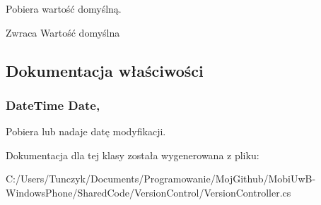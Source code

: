Pobiera wartość domyślną. 

\begin{DoxyReturn}{Zwraca}
Wartość domyślna
\end{DoxyReturn}


\subsection{Dokumentacja właściwości}
\hypertarget{a00021_a9f6dd5f0a254ed27ca791fe4aa2c35cf}{}
\subsubsection[{Date}]{\setlength{\rightskip}{0pt plus 5cm}Date\+Time Date\hspace{0.3cm}{\ttfamily [get]}, {\ttfamily [set]}}\label{a00021_a9f6dd5f0a254ed27ca791fe4aa2c35cf}


Pobiera lub nadaje datę modyfikacji. 



Dokumentacja dla tej klasy została wygenerowana z pliku\+:\begin{DoxyCompactItemize}
\item 
C\+:/\+Users/\+Tunczyk/\+Documents/\+Programowanie/\+Moj\+Github/\+Mobi\+Uw\+B-\/\+Windows\+Phone/\+Shared\+Code/\+Version\+Control/Version\+Controller.\+cs\end{DoxyCompactItemize}

